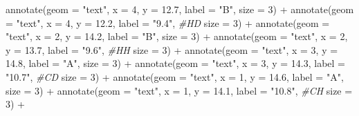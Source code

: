 \documentclass[
]{article}
\newenvironment{Shaded}{\begin{snugshade}}{\end{snugshade}}
\newcommand{\AttributeTok}[1]{\textcolor[rgb]{0.77,0.63,0.00}{#1}}
\newcommand{\CommentTok}[1]{\textcolor[rgb]{0.56,0.35,0.01}{\textit{#1}}}
\newcommand{\DecValTok}[1]{\textcolor[rgb]{0.00,0.00,0.81}{#1}}
\newcommand{\FloatTok}[1]{\textcolor[rgb]{0.00,0.00,0.81}{#1}}
\newcommand{\FunctionTok}[1]{\textcolor[rgb]{0.00,0.00,0.00}{#1}}
\newcommand{\NormalTok}[1]{#1}
\newcommand{\SpecialCharTok}[1]{\textcolor[rgb]{0.00,0.00,0.00}{#1}}
\newcommand{\StringTok}[1]{\textcolor[rgb]{0.31,0.60,0.02}{#1}}
\begin{document}
\begin{Shaded}
\begin{Highlighting}[]
  \FunctionTok{annotate}\NormalTok{(}\AttributeTok{geom =} \StringTok{"text"}\NormalTok{, }\AttributeTok{x =} \DecValTok{4}\NormalTok{, }\AttributeTok{y =} \FloatTok{12.7}\NormalTok{, }\AttributeTok{label =} \StringTok{"B"}\NormalTok{, }
           \AttributeTok{size =} \DecValTok{3}\NormalTok{) }\SpecialCharTok{+}
  \FunctionTok{annotate}\NormalTok{(}\AttributeTok{geom =} \StringTok{"text"}\NormalTok{, }\AttributeTok{x =} \DecValTok{4}\NormalTok{, }\AttributeTok{y =} \FloatTok{12.2}\NormalTok{, }\AttributeTok{label =} \StringTok{"9.4"}\NormalTok{, }\CommentTok{\#HD}
           \AttributeTok{size =} \DecValTok{3}\NormalTok{) }\SpecialCharTok{+}
  \FunctionTok{annotate}\NormalTok{(}\AttributeTok{geom =} \StringTok{"text"}\NormalTok{, }\AttributeTok{x =} \DecValTok{2}\NormalTok{, }\AttributeTok{y =} \FloatTok{14.2}\NormalTok{, }\AttributeTok{label =} \StringTok{"B"}\NormalTok{, }
           \AttributeTok{size =} \DecValTok{3}\NormalTok{) }\SpecialCharTok{+}
  \FunctionTok{annotate}\NormalTok{(}\AttributeTok{geom =} \StringTok{"text"}\NormalTok{, }\AttributeTok{x =} \DecValTok{2}\NormalTok{, }\AttributeTok{y =} \FloatTok{13.7}\NormalTok{, }\AttributeTok{label =} \StringTok{"9.6"}\NormalTok{, }\CommentTok{\#HH}
           \AttributeTok{size =} \DecValTok{3}\NormalTok{) }\SpecialCharTok{+}
  \FunctionTok{annotate}\NormalTok{(}\AttributeTok{geom =} \StringTok{"text"}\NormalTok{, }\AttributeTok{x =} \DecValTok{3}\NormalTok{, }\AttributeTok{y =} \FloatTok{14.8}\NormalTok{, }\AttributeTok{label =} \StringTok{"A"}\NormalTok{, }
           \AttributeTok{size =} \DecValTok{3}\NormalTok{) }\SpecialCharTok{+}
  \FunctionTok{annotate}\NormalTok{(}\AttributeTok{geom =} \StringTok{"text"}\NormalTok{, }\AttributeTok{x =} \DecValTok{3}\NormalTok{, }\AttributeTok{y =} \FloatTok{14.3}\NormalTok{, }\AttributeTok{label =} \StringTok{"10.7"}\NormalTok{, }\CommentTok{\#CD}
           \AttributeTok{size =} \DecValTok{3}\NormalTok{) }\SpecialCharTok{+}
  \FunctionTok{annotate}\NormalTok{(}\AttributeTok{geom =} \StringTok{"text"}\NormalTok{, }\AttributeTok{x =} \DecValTok{1}\NormalTok{, }\AttributeTok{y =} \FloatTok{14.6}\NormalTok{, }\AttributeTok{label =} \StringTok{"A"}\NormalTok{, }
           \AttributeTok{size =} \DecValTok{3}\NormalTok{) }\SpecialCharTok{+}
  \FunctionTok{annotate}\NormalTok{(}\AttributeTok{geom =} \StringTok{"text"}\NormalTok{, }\AttributeTok{x =} \DecValTok{1}\NormalTok{, }\AttributeTok{y =} \FloatTok{14.1}\NormalTok{, }\AttributeTok{label =} \StringTok{"10.8"}\NormalTok{, }\CommentTok{\#CH}
           \AttributeTok{size =} \DecValTok{3}\NormalTok{) }\SpecialCharTok{+}
  

\end{Highlighting}
\end{Shaded}
\end{document}
